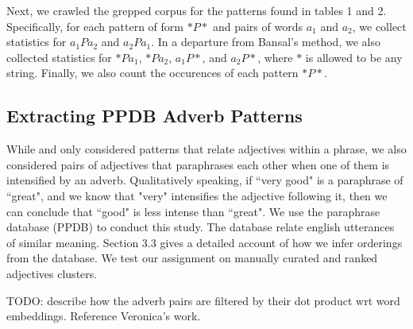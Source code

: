 Next, we crawled the grepped corpus for the patterns found in tables 1 and 2. Specifically, for each pattern of form $* P *$ and pairs of words $a_1$ and $a_2$, we collect statistics for $a_1 P a_2$ and $a_2 P a_1$. In a departure from Bansal's method, we also collected statistics for $* P a_1$, $* P a_2$, $a_1 P *$, and $a_2 P *$, where $*$ is allowed to be any string. Finally, we also count the occurences of each pattern $* P *$.

\subsection{Extracting PPDB Adverb Patterns}

While  and  only considered patterns that relate adjectives within a phrase, we also considered pairs of adjectives that paraphrases each other when one of them is intensified by an adverb. Qualitatively speaking, if ``very good" is a paraphrase of ``great", and we know that "very" intensifies the adjective following it, then we can conclude that ``good" is less intense than ``great". We use the paraphrase database (PPDB) \cite{pavlick-EtAl:2015:ACL-IJCNLP3} to conduct this study. The database relate english utterances of similar meaning. Section 3.3 gives a detailed account of how we infer orderings from the database. We test our assignment on manually curated and ranked adjectives clusters. 

TODO: describe how the adverb pairs are filtered by their dot product wrt word embeddings. Reference Veronica's work.



